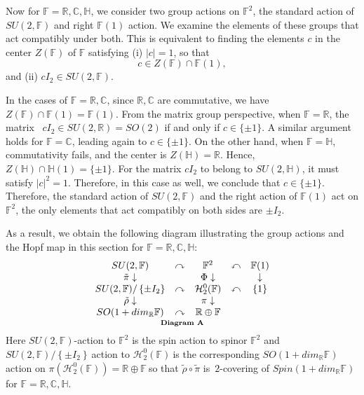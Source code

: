 \documentclass[a4paper]{article}%
\begin{document}
\bigskip

Now for $\mathbb{F}=\mathbb{R},\mathbb{C},\mathbb{H}$, we consider two group
actions on $\mathbb{F}^{2}$, the standard action of $SU(2,\mathbb{F})$ and
right $\mathbb{F}(1)$ action. We examine the elements of these groups that act
compatibly under both. This is equivalent to finding the elements $c$ in the
center $Z(\mathbb{F})$ of $\mathbb{F}$ satisfying (i) $|c|=1$, so that
\[
c\in Z(\mathbb{F})\cap\mathbb{F}(1),
\]
and (ii) $cI_{2}\in SU(2,\mathbb{F})$.

In the cases of $\mathbb{F}=\mathbb{R},\mathbb{C}$, since $\mathbb{R}%
,\mathbb{C}$ are commutative, we have $Z(\mathbb{F})\cap\mathbb{F}%
(1)=\mathbb{F}(1)$. From the matrix group perspective, when $\mathbb{F}%
=\mathbb{R}$, the matrix \ $cI_{2}\in SU(2,\mathbb{R})=SO(2)$ if and only if
$c\in\{\pm1\}$. A similar argument holds for $\mathbb{F}=\mathbb{C}$, leading
again to $c\in\{\pm1\}$. On the other hand, when $\mathbb{F}=\mathbb{H}$,
commutativity fails, and the center is $Z(\mathbb{H})=\mathbb{R}$. Hence,
$Z(\mathbb{H})\cap\mathbb{H}(1)=\{\pm1\}$. For the matrix $cI_{2}$ to belong
to $SU(2,\mathbb{H})$, it must satisfy $|c|^{2}=1$. Therefore, in this case as
well, we conclude that $c\in\{\pm1\}$. Therefore, the standard action of
$SU(2,\mathbb{F})$ and the right action of $\mathbb{F}(1)$ act on
$\mathbb{F}^{2}$, the only elements that act compatibly on both sides are $\pm
I_{2}$.

As a result, we obtain the following diagram illustrating the group actions
and the Hopf map in this section for $\mathbb{F}=\mathbb{R},\mathbb{C}%
,\mathbb{H}$:%
\[
\underset{\text{\textbf{Diagram\ A}}}{%
\begin{array}
[c]{ccccc}%
SU(2,\mathbb{F}) & \curvearrowright & \mathbb{F}^{2} & \curvearrowleft &
\mathbb{F}(1)\\
\tilde{\pi}\downarrow &  & \Phi\downarrow &  & \downarrow\\
SU(2,\mathbb{F})/\left\{  \pm I_{2}\right\}  & \curvearrowright &
\mathcal{H}_{2}^{0}(\mathbb{F}) & \curvearrowleft & \left\{  1\right\} \\
\tilde{\rho}\downarrow &  & \pi\downarrow &  & \\
SO(1+dim_{\mathbb{R}}\mathbb{F}) & \curvearrowright & \mathbb{R}%
\oplus\mathbb{F} &  &
\end{array}
}%
\]
Here $SU(2,\mathbb{F})$-action to $\mathbb{F}^{2}$ is the spin action to
spinor $\mathbb{F}^{2}$ and $SU(2,\mathbb{F})/\left\{  \pm I_{2}\right\}
\ $action to $\mathcal{H}_{2}^{0}(\mathbb{F})\ $is the corresponding
$SO(1+dim_{\mathbb{R}}\mathbb{F})$ action on $\pi\left(  \mathcal{H}_{2}%
^{0}(\mathbb{F})\right)  =\mathbb{R}\oplus\mathbb{F\ }$so that $\tilde{\rho
}\circ\tilde{\pi}$ is\ $2$-covering of $Spin\left(  1+dim_{\mathbb{R}%
}\mathbb{F}\right)  $ for $\mathbb{F}=\mathbb{R},\mathbb{C},\mathbb{H}$.
\end{document}
